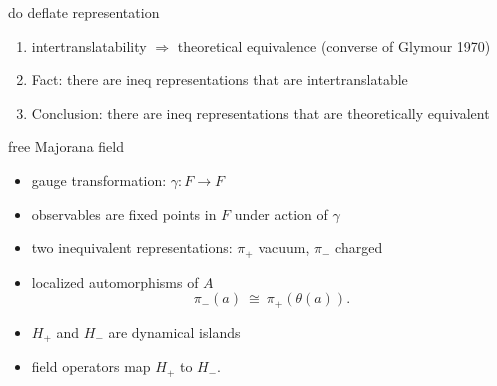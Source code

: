 \documentclass{beamer}
\begin{document}
\begin{frame}{do deflate representation}

\begin{enumerate}
\item intertranslatability $\Longrightarrow$ theoretical equivalence
  (converse of Glymour 1970)
\item Fact: there are ineq representations that are intertranslatable
\item Conclusion: there are ineq representations that are
  theoretically equivalent
\end{enumerate}


\end{frame}











\begin{frame}{free Majorana field}

\begin{itemize}
\item gauge transformation: $\gamma :F\to F$



\item observables are fixed points in $F$ under action of $\gamma$
\item two inequivalent representations: $\pi _+$ vacuum, $\pi _{-}$ charged
\item localized automorphisms of $A$
$$ \pi _{-}(a) \: \cong \: \pi _{+}(\theta (a)) .$$
\item $H_{+}$ and $H_{-}$ are dynamical islands
\item field operators map $H_{+}$ to $H_{-}$.
\end{itemize}






\end{frame}
\end{document}
